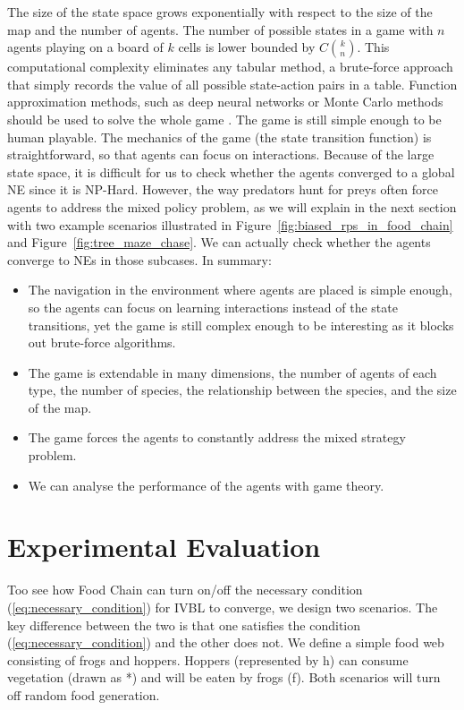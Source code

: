 \documentclass[]{interact}
\theoremstyle{plain}%
\theoremstyle{definition}
\theoremstyle{remark}
\begin{document}
The size of the state space grows exponentially with respect to the size of the map and the number of agents. The number of possible states in a game with $n$ agents playing on a board of $k$ cells is lower bounded by $C{k \choose n}$. This computational complexity eliminates any tabular method, a brute-force approach that simply records the value of all possible state-action pairs in a table. Function approximation methods, such as deep neural networks or Monte Carlo methods should be used to solve the whole game \cite{silver2016mastering}. The game is still simple enough to be human playable. The mechanics of the game (the state transition function) is straightforward, so that agents can focus on interactions. Because of the large state space, it is difficult for us to check whether the agents converged to a global NE since it is NP-Hard. However, the way predators hunt for preys often force agents to address the mixed policy problem, as we will explain in the next section with two example scenarios illustrated in Figure~\ref{fig:biased_rps_in_food_chain} and Figure~\ref{fig:tree_maze_chase}. We can actually check whether the agents converge to NEs in those subcases. In summary:
\begin{itemize}
    \item The navigation in the environment where agents are placed is simple enough, so the agents can focus on learning interactions instead of the state transitions, yet the game is still complex enough to be interesting as it blocks out brute-force algorithms.
    \item The game is extendable in many dimensions, the number of agents of each type, the number of species, the relationship between the species, and the size of the map.
    \item The game forces the agents to constantly address the mixed strategy problem.
    \item We can analyse the performance of the agents with game theory.
\end{itemize}

\section{Experimental Evaluation}
Too see how Food Chain can turn on/off the necessary condition (\ref{eq:necessary_condition}) for IVBL to converge, we design two scenarios. The key difference between the two is that one satisfies the condition (\ref{eq:necessary_condition}) and the other does not. We define a simple food web consisting of frogs and hoppers. Hoppers (represented by h) can consume vegetation (drawn as *) and will be eaten by frogs (f). Both scenarios will turn off random food generation.
\end{document}
